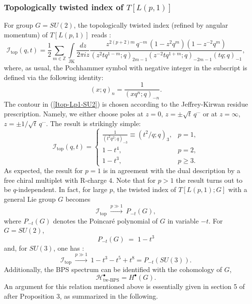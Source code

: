 \documentclass[hyper,letterpaper]{JHEP3}
\newcommand{\be}{\begin{equation}}
\newcommand{\ee}{\end{equation}}
\newcommand{\Z}{{\mathbb Z}}
\def\CH{{\mathcal H}}
\def\CI{{\mathcal I}}
\begin{document}
\subsubsection{Topologically twisted index of ${T[L(p,1)]}$}
\label{sec:TopInd}

For group $G=SU(2)$, the topologically twisted index (refined by angular momentum) of $T[L(p,1)]$ reads \cite{Benini:2015noa}:
\begin{equation}
	\CI_\text{top}(q,t)=\frac{1}{2}\sum_{m\in \Z}\int\limits_\text{JK} \frac{dz}{2\pi i z}
	\frac{z^{2(p+2)m}\,q^{-m}\,(1-z^2q^{m})(1-z^{-2}q^{m})}{(z^2tq^{1-m};q)_{2m-1} (z^{-2}tq^{1+m};q)_{-2m-1}(tq;q)_{-1}},
	\label{Itop-Lp1-SU2}
\end{equation}
where, as usual, the Pochhammer symbol with negative integer in the subscript is defined via the following identity:
\begin{equation}
	(x;q)_n=\frac{1}{(xq^n;q)_{-n}}.
\end{equation}
The contour in (\ref{Itop-Lp1-SU2}) is chosen according to the Jeffrey-Kirwan residue prescription. Namely, we either choose poles at $z=0$, $z=\pm \sqrt{t}\,q^{\cdots}$ or at $z=\infty$, $z=\pm 1/\sqrt{t}\,q^{\cdots}$. The result is strikingly simple:
\begin{equation}
	\CI_\text{top}(q,t)=
	\left\{
	\begin{array}{cr}
		\frac{1}{(t^2q^2;q)_{-3}}\equiv (t^2/q;q)_3,& p=1,\\
		1-t^4,& p=2,\\
		1-t^3,& p\geq 3.
	\end{array}
	\right.
\end{equation}
As expected, the result for $p=1$ is in agreement with the dual description by a free chiral multiplet with R-charge $4$. Note that for $p>1$ the result turns out to be $q$-independent. In fact, for large $p$, the twisted index of $T[L(p,1);G]$ with a general Lie group $G$ becomes
\be
\CI_{\text{top}}~\stackrel{p\gg 1}{\longrightarrow}~ P_{-t}(G),
\ee
where $P_{-t}(G)$ denotes the Poincar\'e polynomial of $G$ in variable $-t$. For $G=SU(2)$,
\be
P_{-t}(G) \; = \; 1-t^3
\ee
and, for $SU(3)$, one has \cite{EVFCBI}:
\be
\CI_{\text{top}}~\stackrel{p\gg 1}{\longrightarrow}~ 1-t^3-t^5+t^8=P_{-t}(SU(3)).
\ee
Additionally, the BPS spectrum can be identified with the cohomology of $G$,
\be
\CH_{\text{tw-BPS}}^\bullet=H^{\bullet}(G).
\ee
An argument for this relation mentioned above is essentially given in section 5 of \cite{Andersen:2016hoj} after Proposition 3, as summarized in the following.
\end{document}
